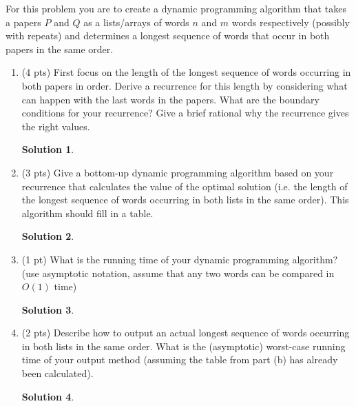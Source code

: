 \documentclass[11pt]{article}
\newtheorem*{solution}{Solution}
\begin{document}
\begin{enumerate}
For this problem you are to create a dynamic programming algorithm that takes a papers $P$ and $Q$ as a lists/arrays of words $n$ and $m$ words respectively (possibly with repeats) and determines a longest sequence of words that occur in both papers in the same order.
\newpage
\begin{enumerate}
\item (4 pts) First focus on the length of the longest sequence of words occurring in both papers in order.
Derive a recurrence for this length by considering what can happen with the last words in the papers.
What are the boundary conditions for your recurrence?
Give a brief rational why the recurrence gives the right values.

\begin{solution}

\end{solution}
\newpage
\item (3 pts) Give a bottom-up dynamic programming algorithm based on your recurrence that calculates the value of the optimal solution (i.e. the length of the longest sequence of words occurring in both lists in the same order).   This algorithm should fill in a table.
\begin{solution}

\end{solution}
\newpage

\item (1 pt) What is the running time of your dynamic programming algorithm? (use asymptotic notation, assume that any two words can be compared in $O(1)$ time)
\begin{solution}

\end{solution}
\newpage

\item (2 pts) Describe how to output an actual longest sequence of words occurring in both lists in the same order.
What is the (asymptotic) worst-case running time of your output method (assuming the table from part (b) has already been calculated).
\begin{solution}

\end{solution}
\end{enumerate}  


\end{enumerate} 
\end{document}
